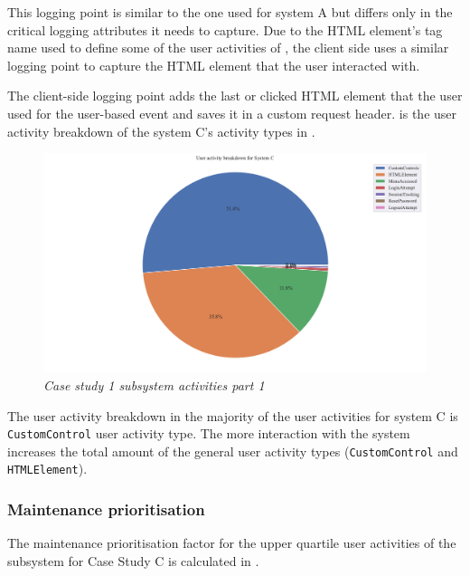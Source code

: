 This logging point is similar to the one used for system A but differs only in the critical logging attributes it needs to capture. Due to the HTML element's tag name used to define some of the user activities of , the client side uses a similar logging point to capture the HTML element that the user interacted with.\par The client-side logging point adds the last or clicked HTML element that the user used for the user-based event and saves it in a custom request header.  is the user activity breakdown of the system C's activity types in .

\begin{figure}[!htb]
	\centering %
	\includegraphics[width=0.95\linewidth]{img/ch3/analysis/case_C_breakdown.pdf}
	\caption[Case study 1 subsystem activities part 1]
	{\textit{Case study 1 subsystem activities part 1}}\label{fig:ch3_caseCBreakdown}
\end{figure}

\clearpage

The user activity breakdown in  the majority of the user activities for system C is \texttt{CustomControl} user activity type. The more interaction with the system increases the total amount of the general user activity types (\texttt{CustomControl} and \texttt{HTMLElement}).

\subsubsection{Maintenance prioritisation}
The maintenance prioritisation factor for the upper quartile user activities of the subsystem for Case Study C is calculated in .


